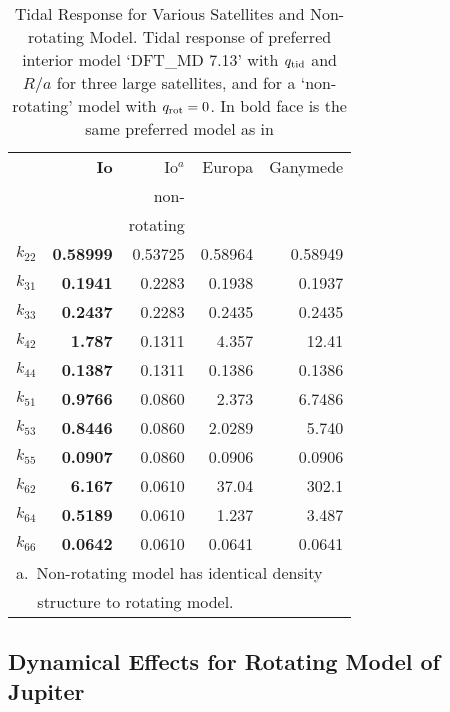\begin{table}
\centering

\caption{Tidal Response for Various Satellites and Non-rotating Model. Tidal response of preferred interior model `DFT\_MD 7.13' with
    $q_{\rm tid}$ and $R/a$ for three large satellites, and for a `non-rotating'
    model with $q_{\rm rot}=0$. In bold face is the same preferred model as in
    \label{tab:satellite_harmonics} }
\begin{tabular}{l|rrrr}
    \hline
    {} & {\bf Io} & {Io$^a$} &
    {Europa} & {Ganymede} \\
    {}  &  {} &
    {non-} & {} & {} \\
    {}  &  {} & {rotating} & \\
    \hline
    $k_{22}$  &  {\bf  0.58999}  &  0.53725  &  0.58964  &  0.58949  \\
    $k_{31}$  &  {\bf  0.1941}   &  0.2283   &  0.1938   &  0.1937   \\
    $k_{33}$  &  {\bf  0.2437}   &  0.2283   &  0.2435   &  0.2435   \\
    $k_{42}$  &  {\bf  1.787}    &  0.1311   &  4.357    &  12.41    \\
    $k_{44}$  &  {\bf  0.1387}   &  0.1311   &  0.1386   &  0.1386   \\
    $k_{51}$  &  {\bf  0.9766}   &  0.0860   &  2.373    &  6.7486   \\
    $k_{53}$  &  {\bf  0.8446}   &  0.0860   &  2.0289   &  5.740    \\
    $k_{55}$  &  {\bf  0.0907}   &  0.0860   &  0.0906   &  0.0906   \\
    $k_{62}$  &  {\bf  6.167}    &  0.0610   &  37.04    &  302.1    \\
    $k_{64}$  &  {\bf  0.5189}   &  0.0610   &  1.237    &  3.487    \\
    $k_{66}$  &  {\bf  0.0642}   &  0.0610   &  0.0641   &  0.0641   \\
    \hline
    \multicolumn{5}{l}{a.~Non-rotating model has identical density }\\
    \multicolumn{5}{l}{~~ structure to rotating model.}
\end{tabular}

\end{table}

\subsection{ Dynamical Effects for Rotating Model of Jupiter}


